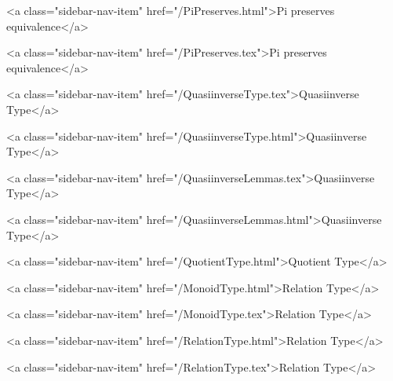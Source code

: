       
        
          <a class="sidebar-nav-item" href="/PiPreserves.html">Pi preserves equivalence</a>
        
      
    
      
        
          <a class="sidebar-nav-item" href="/PiPreserves.tex">Pi preserves equivalence</a>
        
      
    
      
        
          <a class="sidebar-nav-item" href="/QuasiinverseType.tex">Quasiinverse Type</a>
        
      
    
      
        
          <a class="sidebar-nav-item" href="/QuasiinverseType.html">Quasiinverse Type</a>
        
      
    
      
        
          <a class="sidebar-nav-item" href="/QuasiinverseLemmas.tex">Quasiinverse Type</a>
        
      
    
      
        
          <a class="sidebar-nav-item" href="/QuasiinverseLemmas.html">Quasiinverse Type</a>
        
      
    
      
        
          <a class="sidebar-nav-item" href="/QuotientType.html">Quotient Type</a>
        
      
    
      
        
          <a class="sidebar-nav-item" href="/MonoidType.html">Relation Type</a>
        
      
    
      
        
          <a class="sidebar-nav-item" href="/MonoidType.tex">Relation Type</a>
        
      
    
      
        
          <a class="sidebar-nav-item" href="/RelationType.html">Relation Type</a>
        
      
    
      
        
          <a class="sidebar-nav-item" href="/RelationType.tex">Relation Type</a>
        
